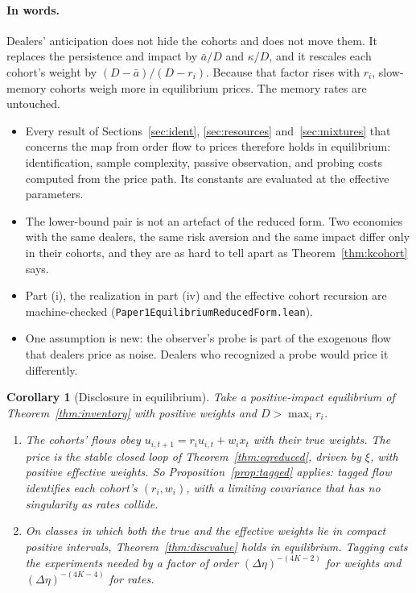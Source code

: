 \documentclass[12pt]{article}
\newtheorem{corollary}[theorem]{Corollary}
\theoremstyle{definition}
\theoremstyle{remark}
\begin{document}
\paragraph{In words.} Dealers' anticipation does not hide the cohorts and does not move them. It replaces the persistence and impact by $\bar a/D$ and $\kappa/D$, and it rescales each cohort's weight by $(D-\bar a)/(D-r_i)$. Because that factor rises with $r_i$, slow-memory cohorts weigh more in equilibrium prices. The memory rates are untouched.
\begin{itemize}[itemsep=1pt,topsep=2pt]
\item Every result of Sections~\ref{sec:ident}, \ref{sec:resources} and~\ref{sec:mixtures} that concerns the map from order flow to prices therefore holds in equilibrium: identification, sample complexity, passive observation, and probing costs computed from the price path. Its constants are evaluated at the effective parameters.
\item The lower-bound pair is not an artefact of the reduced form. Two economies with the same dealers, the same risk aversion and the same impact differ only in their cohorts, and they are as hard to tell apart as Theorem~\ref{thm:kcohort} says.
\item Part (i), the realization in part (iv) and the effective cohort recursion are machine-checked (\nolinkurl{Paper1EquilibriumReducedForm.lean}).
\item One assumption is new: the observer's probe is part of the exogenous flow that dealers price as noise. Dealers who recognized a probe would price it differently.
\end{itemize}

\begin{corollary}[Disclosure in equilibrium]\label{cor:eqdisclosure}
Take a positive-impact equilibrium of Theorem~\ref{thm:inventory} with positive weights and $D>\max_ir_i$.
\begin{enumerate}[label=(\roman*),itemsep=1pt]
\item The cohorts' flows obey $u_{i,t+1}=r_iu_{i,t}+w_ix_t$ with their \emph{true} weights. The price is the stable closed loop of Theorem~\ref{thm:eqreduced}, driven by $\xi$, with positive effective weights. So Proposition~\ref{prop:tagged} applies: tagged flow identifies each cohort's $(r_i,w_i)$, with a limiting covariance that has no singularity as rates collide.
\item On classes in which both the true and the effective weights lie in compact positive intervals, Theorem~\ref{thm:discvalue} holds in equilibrium. Tagging cuts the experiments needed by a factor of order $(\Delta\eta)^{-(4K-2)}$ for weights and $(\Delta\eta)^{-(4K-4)}$ for rates.
\end{enumerate}
\end{corollary}
\end{document}
